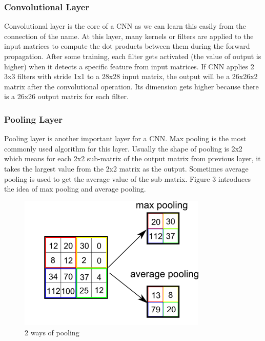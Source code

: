 \documentclass[12pt]{spieman}
\begin{document}
\begin{spacing}{1.5}
        \subsubsection{Convolutional Layer}
        Convolutional layer is the core of a CNN as we can learn this easily from the connection of the name. At this layer, many kernels or filters are applied to the input matrices to compute the dot products between them during the forward propagation. After some training, each filter gets activated (the value of output is higher) when it detects a specific feature from input matrices. If CNN applies 2 3x3 filters with stride 1x1 to a 28x28 input matrix, the output will be a 26x26x2 matrix after the convolutional operation. Its dimension gets higher because there is a 26x26 output matrix for each filter.
        \subsubsection{Pooling Layer}
        Pooling layer is another important layer for a CNN. Max pooling is the most commonly used algorithm for this layer. Usually the shape of pooling is 2x2 which means for each 2x2 sub-matrix of the output matrix from previous layer, it takes the largest value from the 2x2 matrix as the output. Sometimes average pooling is used to get the average value of the sub-matrix. Figure 3 introduces the idea of max pooling and average pooling.
        \begin{figure}[h!]
        \centering
        \includegraphics[width=0.80\textwidth]{figures/pooling.png}
        \caption{2 ways of pooling}
        \label{threadsVsSync}
        \end{figure}


\end{spacing}
\end{document}
